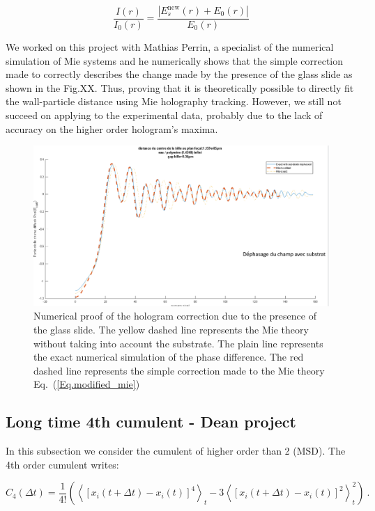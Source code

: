 \begin{equation}
	\frac{I(r)}{I_0(r)} = \frac{|E_s^\mathrm{new}(r) + E_0(r)|}{E_0(r)}
	\label{Eq.modified_mie}
\end{equation}

We worked on this project with Mathias Perrin, a specialist of the numerical simulation of Mie systems and he numerically shows that the simple correction made to correctly describes the change made by the presence of the glass slide as shown in the Fig.XX. Thus, proving that it is theoretically possible to directly fit the wall-particle distance using Mie holography tracking. However, we still not succeed on applying to the experimental data, probably due to the lack of accuracy on the higher order hologram's maxima.

\begin{figure}[H]
	\centering
	\includegraphics[scale=0.5]{02_body/chapter4/images/h_measurement/simulation_glass_correction.png}
	\caption{Numerical proof of the hologram correction due to the presence of the glass slide. The yellow dashed line represents the Mie theory without taking into account the substrate. The plain line represents the exact numerical simulation of the phase difference. The red dashed line represents the simple correction made to the Mie theory Eq.~(\ref{Eq.modified_mie})}
	\label{fig.glass_correction}
\end{figure}

\subsection{Long time 4th cumulent - Dean project}

In this subsection we consider the cumulent of higher order than 2 (\gls{MSD}). The 4th order cumulent writes:

\begin{equation}
	C_4 (\Delta t) = \frac{1}{4!} \left(
		\left\langle [ x_i(t + \Delta t) - x_i(t) ]^4 \right\rangle_t
		- 3\left\langle [ x_i(t + \Delta t) - x_i(t) ]^2 \right\rangle_t ^2
	   \right) ~.
	   \label{c4}
\end{equation}

